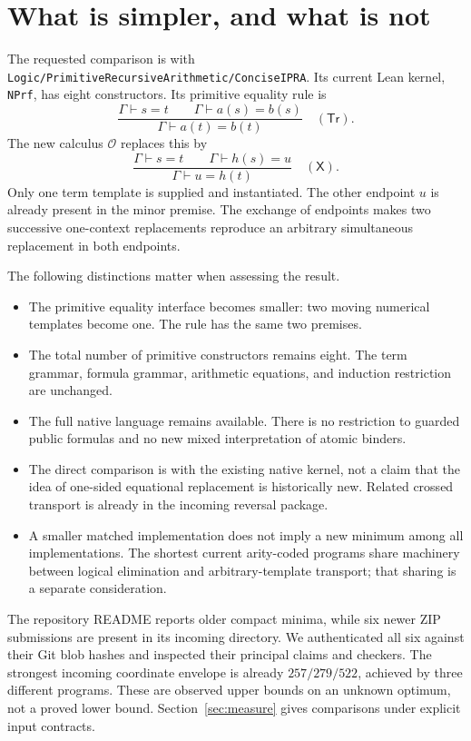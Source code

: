 \documentclass[11pt,letterpaper]{article}
\theoremstyle{definition}\newtheorem{definition}[theorem]{Definition}
\theoremstyle{remark}\newtheorem{remark}[theorem]{Remark}
\newcommand{\Ocal}{\mathcal O}
\newcommand{\One}{\mathsf X}
\newcommand{\Tr}{\mathsf{Tr}}
\newcommand{\file}[1]{\texttt{\nolinkurl{#1}}}
\newcommand{\code}[1]{\texttt{#1}}
\begin{document}
\section{What is simpler, and what is not}
\label{sec:claims}
The requested comparison is with
\file{Logic/PrimitiveRecursiveArithmetic/ConciseIPRA}. Its current Lean
kernel, \code{NPrf}, has eight constructors. Its primitive equality rule is
\[
 \frac{\Gamma\vdash s=t\qquad
       \Gamma\vdash a(s)=b(s)}
      {\Gamma\vdash a(t)=b(t)}\quad(\Tr).
 \tag{1}\label{eq:old}
\]
The new calculus \(\Ocal\) replaces this by
\[
 \boxed{\quad
 \frac{\Gamma\vdash s=t\qquad\Gamma\vdash h(s)=u}
      {\Gamma\vdash u=h(t)}\quad(\One).
 \quad}\tag{2}\label{eq:new}
\]
Only one term template is supplied and instantiated. The other endpoint
\(u\) is already present in the minor premise. The exchange of endpoints
makes two successive one-context replacements reproduce an arbitrary
simultaneous replacement in both endpoints.

The following distinctions matter when assessing the result.
\begin{itemize}
\item The primitive equality interface becomes smaller: two moving numerical
  templates become one. The rule has the same two premises.
\item The total number of primitive constructors remains eight. The term
  grammar, formula grammar, arithmetic equations, and induction restriction
  are unchanged.
\item The full native language remains available. There is no restriction to
  guarded public formulas and no new mixed interpretation of atomic binders.
\item The direct comparison is with the existing native kernel, not a claim
  that the idea of one-sided equational replacement is historically new.
  Related crossed transport is already in the incoming reversal package.
\item A smaller matched implementation does not imply a new minimum among
  all implementations. The shortest current arity-coded programs share
  machinery between logical elimination and arbitrary-template transport;
  that sharing is a separate consideration.
\end{itemize}

The repository README reports older compact minima, while six newer ZIP
submissions are present in its incoming directory. We authenticated all six
against their Git blob hashes and inspected their principal claims and
checkers. The strongest incoming coordinate envelope is already
\(257/279/522\), achieved by three different programs. These are observed
upper bounds on an unknown optimum, not a proved lower bound.
Section~\ref{sec:measure} gives comparisons under explicit input contracts.
\cite{readme,incoming,guardedsource,reversal}
\end{document}
